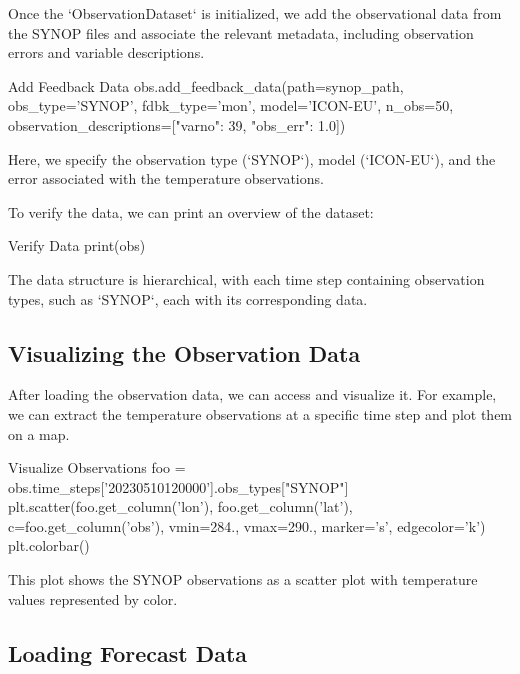Once the `ObservationDataset` is initialized, we add the observational data from the SYNOP files and associate the relevant metadata, including observation errors and variable descriptions.

\begin{codeonly}{Add Feedback Data}
obs.add_feedback_data(path=synop_path, obs_type='SYNOP', fdbk_type='mon', model='ICON-EU', n_obs=50, observation_descriptions=[{"varno": 39, "obs_err": 1.0}])
\end{codeonly}

Here, we specify the observation type (`SYNOP`), model (`ICON-EU`), and the error associated with the temperature observations.

To verify the data, we can print an overview of the dataset:

\begin{codeonly}{Verify Data}
print(obs)
\end{codeonly}

The data structure is hierarchical, with each time step containing observation types, such as `SYNOP`, each with its corresponding data.

%
\subsection{Visualizing the Observation Data}

After loading the observation data, we can access and visualize it. For example, we can extract the temperature observations at a specific time step and plot them on a map.

\begin{codeonly}{Visualize Observations}
foo = obs.time_steps['20230510120000'].obs_types["SYNOP"]
plt.scatter(foo.get_column('lon'), foo.get_column('lat'), c=foo.get_column('obs'), vmin=284., vmax=290., marker='s', edgecolor='k')
plt.colorbar()
\end{codeonly}

This plot shows the SYNOP observations as a scatter plot with temperature values represented by color.

%
\subsection{Loading Forecast Data}

